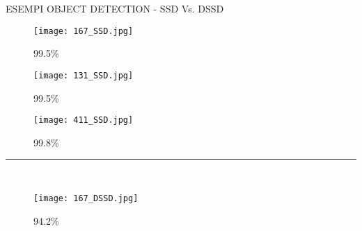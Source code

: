 \begin{frame}{ESEMPI OBJECT DETECTION - SSD Vs. DSSD}
    \begin{minipage}{\linewidth}
        \vspace{0.3cm}
        \begin{minipage}{0.32\linewidth}
            \begin{figure}
                \centering
                \vspace{-0.04cm}
                \texttt{[image: 167\_SSD.jpg]}
                \caption{99.5\%}
            \end{figure}
        \end{minipage}
        \hspace{0.35cm}
        \begin{minipage}{0.32\linewidth}
            \begin{figure}
                \centering
                \texttt{[image: 131\_SSD.jpg]}
                \caption{99.5\%}
            \end{figure}
        \end{minipage}
        \hspace{-0.50cm}
        \begin{minipage}{0.32\linewidth}
            \begin{figure}
                \centering
                \texttt{[image: 411\_SSD.jpg]}  
                \caption{99.8\%}
            \end{figure}
        \end{minipage}
    \end{minipage}  
    \dotfill
    {\hspace*{-0.3cm}\rule{\textwidth}{1pt}}\\
    \vspace{0.3cm}
    \centering{\bfseries{\color{OliveGreen}{\Large DSSD}}}  
    \begin{minipage}{\linewidth}
        \vspace{0.3cm}
        \begin{minipage}{0.32\linewidth}
            \begin{figure}
                \centering
                \vspace{-0.04cm}
                \texttt{[image: 167\_DSSD.jpg]}
                \caption{94.2\%}
            \end{figure}

\end{minipage}
\end{minipage}
\end{frame}

